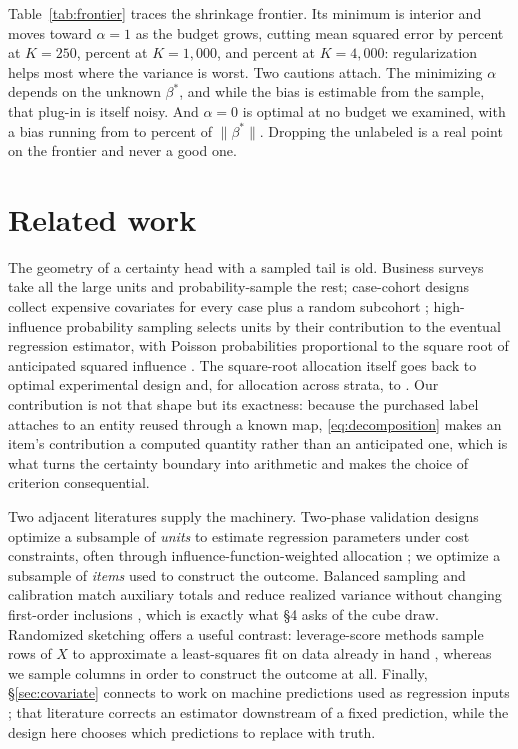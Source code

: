 \documentclass[11pt]{article}
\theoremstyle{plain}
\theoremstyle{remark}
\begin{document}
Table~\ref{tab:frontier} traces the shrinkage frontier. Its minimum is interior and moves toward $\alpha=1$ as the budget grows, cutting mean squared error by \ShrinkGainSmall{} percent at $K=250$, \ShrinkGainMid{} percent at $K=1{,}000$, and \ShrinkGainLarge{} percent at $K=4{,}000$: regularization helps most where the variance is worst. Two cautions attach. The minimizing $\alpha$ depends on the unknown $\beta^*$, and while the bias is estimable from the sample, that plug-in is itself noisy. And $\alpha=0$ is optimal at no budget we examined, with a bias running from \ZeroFillBiasLo{} to \ZeroFillBiasHi{} percent of $\|\beta^*\|$. Dropping the unlabeled is a real point on the frontier and never a good one.

\section{Related work}

The geometry of a certainty head with a sampled tail is old. Business surveys take all the large units and probability-sample the rest; case-cohort designs collect expensive covariates for every case plus a random subcohort \citep{Prentice1986}; high-influence probability sampling selects units by their contribution to the eventual regression estimator, with Poisson probabilities proportional to the square root of anticipated squared influence \citep{Clark2022}. The square-root allocation itself goes back to optimal experimental design \citep{Kiefer1959} and, for allocation across strata, to \citet{Neyman1934}. Our contribution is not that shape but its exactness: because the purchased label attaches to an entity reused through a known map, \eqref{eq:decomposition} makes an item's contribution a computed quantity rather than an anticipated one, which is what turns the certainty boundary into arithmetic and makes the choice of criterion consequential.

Two adjacent literatures supply the machinery. Two-phase validation designs optimize a subsample of \emph{units} to estimate regression parameters under cost constraints, often through influence-function-weighted allocation \citep{ChenLumley2022,McIsaacCook2015}; we optimize a subsample of \emph{items} used to construct the outcome. Balanced sampling and calibration match auxiliary totals and reduce realized variance without changing first-order inclusions \citep{DevilleSarndal1992,DevilleTille2004}, which is exactly what \S4 asks of the cube draw. Randomized sketching offers a useful contrast: leverage-score methods sample rows of $X$ to approximate a least-squares fit on data already in hand \citep{DrineasMahoney2016}, whereas we sample columns in order to construct the outcome at all. Finally, \S\ref{sec:covariate} connects to work on machine predictions used as regression inputs \citep{FongTyler2021}; that literature corrects an estimator downstream of a fixed prediction, while the design here chooses which predictions to replace with truth.
\end{document}
